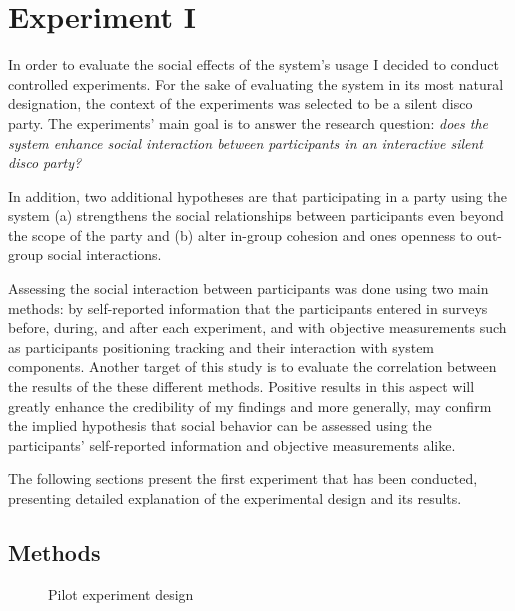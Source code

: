 \documentclass[a4paper,11pt]{article}
\begin{document}
{\section{Experiment I}

In order to evaluate the social effects of the system's usage I decided to conduct controlled experiments.
For the sake of evaluating the system in its most natural designation, the context of the experiments was selected to be a silent disco party.
The experiments' main goal is to answer the research question: \emph{does the system enhance social interaction between participants in an interactive silent disco party?}

In addition, two additional hypotheses are that participating in a party using the system (a) strengthens the social relationships between participants even beyond the scope of the party and (b) alter in-group cohesion and ones openness to out-group social interactions.

Assessing the social interaction between participants was done using two main methods: by self-reported information that the participants entered in surveys before, during, and after each experiment, and with objective measurements such as participants positioning tracking and their interaction with system components.
Another target of this study is to evaluate the correlation between the results of the these different methods.
Positive results in this aspect will greatly enhance the credibility of my findings and more generally, may confirm the implied hypothesis that social behavior can be assessed using the participants' self-reported information and objective measurements alike.

The following sections present the first experiment that has been conducted, presenting detailed explanation of the experimental design and its results.

\subsection{Methods}

\begin{figure}[!htb]
	\centering
	\def\svgwidth{0.95\columnwidth}
  	
	\caption{Pilot experiment design}\label{fig:pilot}
\end{figure}

}
\end{document}
